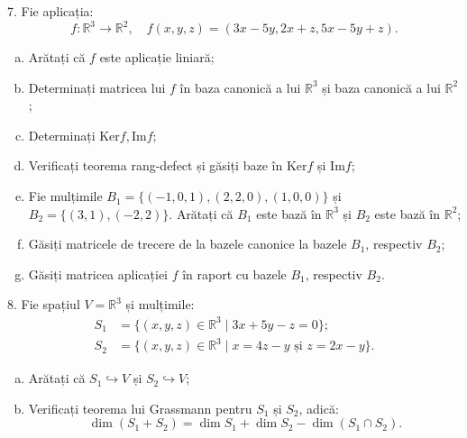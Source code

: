 \documentclass[11pt,a4paper]{article}
\newcommand\RR{\mathbb{R}}
\theoremstyle{dotless}
\theoremstyle{dotlessdr}
\begin{document}
\vspace{1cm}

7. Fie aplicația:
\[
  f : \RR^3 \to \RR^2, \quad f(x, y, z) = (3x - 5y, 2x + z, 5x - 5y + z).
\]
\begin{enumerate}[(a)]
\item Arătați că $f$ este aplicație liniară;
\item Determinați matricea lui $f$ în baza canonică a lui $\RR^3$ și baza canonică
  a lui $\RR^2$;
\item Determinați $\mathrm{Ker}f, \mathrm{Im}f$;
\item Verificați teorema rang-defect și găsiți baze în $\mathrm{Ker}f$ și $\mathrm{Im}f$;
\item Fie mulțimile $B_1 = \{ (-1, 0, 1), (2, 2, 0), (1, 0, 0) \}$ și
  $B_2 = \{ (3, 1), (-2, 2) \}$. Arătați că $B_1$ este bază în $\RR^3$ și
  $B_2$ este bază în $\RR^2$;
\item Găsiți matricele de trecere de la bazele canonice la bazele $B_1$, respectiv $B_2$;
\item Găsiți matricea aplicației $f$ în raport cu bazele $B_1$, respectiv $B_2$.
\end{enumerate}

\vspace{1cm}

8. Fie spațiul $V = \RR^3$ și mulțimile:
\begin{align*}
  S_1 &= \{ (x, y, z) \in \RR^3 \mid 3x + 5y - z = 0 \}; \\
  S_2 &= \{ (x, y, z) \in \RR^3 \mid x = 4z - y \text{ și } z = 2x - y \}.
\end{align*}
\begin{enumerate}[(a)]
\item Arătați că $S_1 \hookrightarrow V$ și $S_2 \hookrightarrow V$;
\item Verificați teorema lui Grassmann pentru $S_1$ și $S_2$, adică:
  \[
    \dim(S_1 + S_2) = \dim S_1 + \dim S_2 - \dim (S_1 \cap S_2).
  \]
\end{enumerate}
\end{document}
